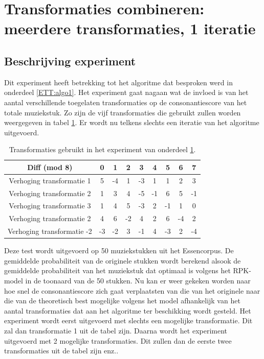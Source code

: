 \section{Transformaties combineren: meerdere transformaties, 1 iteratie}
\label{experiment:2}
\subsection{Beschrijving experiment}
Dit experiment heeft betrekking tot het algoritme dat besproken werd in onderdeel \ref{ETT:algo1}. Het experiment gaat nagaan wat de invloed is van het aantal verschillende toegelaten transformaties op de consonantiescore van het totale muziekstuk. Zo zijn de vijf transformaties die gebruikt zullen worden weergegeven in tabel \ref{tabel:exp2}. Er wordt nu telkens slechts een iteratie van het algoritme uitgevoerd.\\

\begin{table}
  \centering
  \begin{tabular}{c | c c c c c c c c }
    Diff (mod 8) & 0 & 1 & 2 & 3 & 4 & 5 & 6 & 7 \\
    \hline
    \hline
    Verhoging transformatie 1 & 5 & -4 & 1 & -3 & 1 & 1 & 2 & 3 \\
    \hline
    Verhoging transformatie 2 & 1 & 3 & 4 & -5 & -1 & 6 & 5 & -1 \\
    \hline
    Verhoging transformatie 3 & 1 & 4 & 5 & -3 & 2 & -1 & 1 & 0 \\
    \hline
    Verhoging transformatie 2 & 4 & 6 & -2 & 4 & 2 & 6 & -4 & 2 \\
    \hline
    Verhoging transformatie -2 & -3 & -2 & 3 & -1 & 4 & -3 & 2 & -4 \\
  \end{tabular}
  \caption{Transformaties gebruikt in het experiment van onderdeel \ref{experiment:2}.}
  \label{tabel:exp2}
\end{table}

Deze test wordt uitgevoerd op 50 muziekstukken uit het Essencorpus. De gemiddelde probabiliteit van de originele stukken wordt berekend alsook de gemiddelde probabiliteit van het muziekstuk dat optimaal is volgens het RPK-model in de toonaard van de 50 stukken. Nu kan er weer gekeken worden naar hoe snel de consonantiescore zich gaat verplaatsten van die van het originele naar die van de theoretisch best mogelijke volgens het model afhankelijk van het aantal transformaties dat aan het algoritme ter beschikking wordt gesteld. Het experiment wordt eerst uitgevoerd met slechts een mogelijke transformatie. Dit zal dan transformatie 1 uit de tabel zijn. Daarna wordt het experiment uitgevoerd met 2 mogelijke transformaties. Dit zullen dan de eerste twee transformaties uit de tabel zijn enz..

